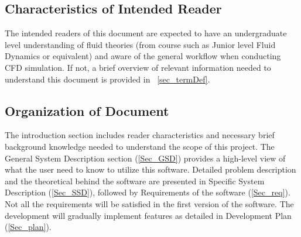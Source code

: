 \documentclass[12pt]{article}
\begin{document}
\subsection{Characteristics of Intended Reader} \label{sec_IntendedReader}

The intended readers of this document are expected to have an undergraduate level understanding of fluid theories (from course such as Junior level Fluid Dynamics or equivalent) and aware of the general workflow when conducting CFD simulation. If not, a brief overview of relevant information needed to understand this document is provided in ~\ref{sec_termDef}.



\subsection{Organization of Document}
The introduction section includes reader characteristics and necessary brief background knowledge needed to understand the scope of this project. The General System Description section (\ref{Sec_GSD}) provides a high-level view of what the user need to know to utilize this software. Detailed problem description and the theoretical behind the software are presented in Specific System Description (\ref{Sec_SSD}), followed by Requirements of the software (\ref{Sec_req}). Not all the requirements will be satisfied in the first version of the software. The development will gradually implement features as detailed in Development Plan (\ref{Sec_plan}).
\end{document}

